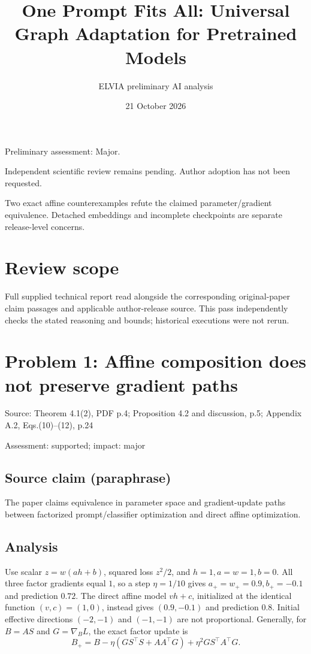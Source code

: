 \documentclass[11pt]{article}
\begin{document}
\title{One Prompt Fits All: Universal Graph Adaptation for Pretrained Models}

\author{ELVIA preliminary AI analysis}\date{21 October 2026}\maketitle

Preliminary assessment: Major.\par

Independent scientific review remains pending. Author adoption has not been requested.

Two exact affine counterexamples refute the claimed parameter/gradient equivalence. Detached embeddings and incomplete checkpoints are separate release-level concerns.

\section*{Review scope}

Full supplied technical report read alongside the corresponding original-paper claim passages and applicable author-release source. This pass independently checks the stated reasoning and bounds; historical executions were not rerun.

\section*{Problem 1: Affine composition does not preserve gradient paths}

Source: Theorem 4.1(2), PDF p.4; Proposition 4.2 and discussion, p.5; Appendix A.2, Eqs.(10)–(12), p.24

Assessment: supported; impact: major

\subsection*{Source claim (paraphrase)}

The paper claims equivalence in parameter space and gradient-update paths between factorized prompt/classifier optimization and direct affine optimization.

\subsection*{Analysis}

Use scalar \(z=w(ah+b)\), squared loss \(z^2/2\), and \(h=1,a=w=1,b=0\). All three factor gradients equal \(1\), so a step \(\eta=1/10\) gives \(a_+=w_+=0.9,b_+=-0.1\) and prediction \(0.72\). The direct affine model \(vh+c\), initialized at the identical function \((v,c)=(1,0)\), instead gives \((0.9,-0.1)\) and prediction \(0.8\). Initial effective directions \((-2,-1)\) and \((-1,-1)\) are not proportional. Generally, for \(B=AS\) and \(G=\nabla_B L\), the exact factor update is \[B_+=B-\eta(GS^\top S+AA^\top G)+\eta^2GS^\top A^\top G.\]
\end{document}
